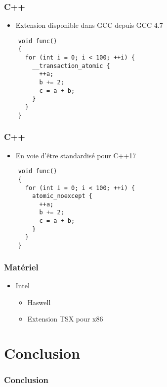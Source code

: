 \documentclass{beamer}
\begin{document}
\begin{frame}[fragile]
\frametitle{C++}
\begin{itemize}
\item Extension disponible dans GCC depuis GCC 4.7
\end{itemize}
\begin{lstlisting}
    void func()
    {
      for (int i = 0; i < 100; ++i) {
        __transaction_atomic {
          ++a;
          b += 2;
          c = a + b;
        }
      }
    }
\end{lstlisting}
\end{frame}

\begin{frame}[fragile]
\frametitle{C++}
\begin{itemize}
\item En voie d'être standardisé pour C++17
\end{itemize}
\begin{lstlisting}
    void func()
    {
      for (int i = 0; i < 100; ++i) {
        atomic_noexcept {
          ++a;
          b += 2;
          c = a + b;
        }
      }
    }
\end{lstlisting}
\end{frame}

\begin{frame}
\frametitle{Matériel}
\begin{itemize}
\item Intel
\begin{itemize}
\item Haswell
\item Extension TSX pour x86
\end{itemize}
\end{itemize}
\end{frame}

\section{Conclusion}
\begin{frame}
\frametitle{Conclusion}

\end{frame}
\end{document}
